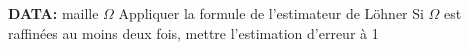 \begin{algorithmic}
    \STATE \textbf{DATA:} maille \(\Omega\)
    \STATE Appliquer la formule de l'estimateur de Löhner
    \STATE Si \(\Omega\) est raffinées au moins deux fois, mettre l'estimation d'erreur à 1
\end{algorithmic}